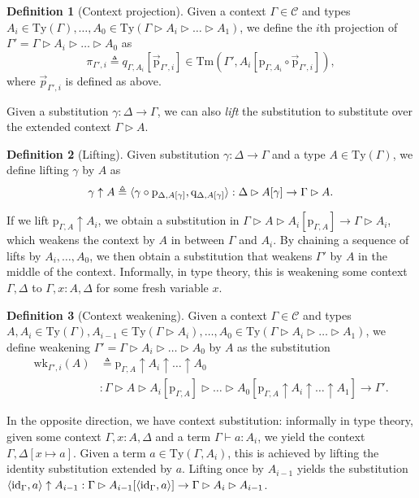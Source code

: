 \documentclass{article}
\renewcommand{\_}{\textrm{\textscale{.5}{\textunderscore}}}
\DeclarePairedDelimiter{\ctxt}{\langle}{\rangle}
\newcommand{\Tm}{\mathrm{Tm}}
\newcommand{\Ty}{\mathrm{Ty}}
\newcommand{\id}{\mathrm{id}}
\newcommand{\p}{\mathrm{p}}
\newcommand{\q}{\mathrm{q}}
\newcommand{\wk}{\mathrm{wk}}
\theoremstyle{definition}
\newtheorem{definition}{Definition}[section]
\theoremstyle{plain}
\begin{document}
\begin{definition}[Context projection]
Given a context $\Gamma \in \mathcal{C}$ and
types $A_i \in \Ty(\Gamma), \dots, A_0 \in \Ty(\Gamma \rhd A_i \rhd \dots \rhd A_1)$,
we define the $i$th projection of $\Gamma' = \Gamma \rhd A_i \rhd \dots \rhd A_0$
as $$\pi_{\Gamma', i} \triangleq q_{\Gamma, A_i}[\vec{\p}_{\Gamma', i}] \in \Tm(\Gamma', A_i[\p_{\Gamma, A_i} \circ \vec{\p}_{\Gamma', i}]),$$
where $\vec{p}_{\Gamma', i}$ is defined as above.
\end{definition}

Given a substitution $\gamma : \Delta \to \Gamma$, we can also \emph{lift} the substitution to substitute over the extended context $\Gamma \rhd A$.

\begin{definition}[Lifting]
Given substitution $\gamma : \Delta \to \Gamma$ and a type $A \in \Ty(\Gamma)$, we define lifting $\gamma$ by $A$ as
$$\gamma \uparrow A \triangleq \ctxt{\gamma \circ \p_{\Delta, A[\gamma]}, \q_{\Delta, A[\gamma]}} : \Delta \rhd A[\gamma] \to \Gamma \rhd A.$$
\end{definition}

If we lift $\p_{\Gamma, A} \uparrow A_i$, we obtain a substitution in $\Gamma \rhd A \rhd A_i[\p_{\Gamma, A}] \to \Gamma \rhd A_i$,
which weakens the context by $A$ in between $\Gamma$ and $A_i$.
By chaining a sequence of lifts by $A_i, \dots, A_0$,
we then obtain a substitution that weakens $\Gamma'$ by $A$ in the middle of the context.
Informally, in type theory, this is weakening some context $\Gamma, \Delta$ to $\Gamma, x:A, \Delta$
for some fresh variable $x$.

\begin{definition}[Context weakening]
Given a context $\Gamma \in \mathcal{C}$ and types $A, A_i \in \Ty(\Gamma), A_{i-1} \in \Ty(\Gamma \rhd A_i), \dots, A_0 \in \Ty(\Gamma \rhd A_i \rhd \dots \rhd A_1)$,
we define weakening $\Gamma' = \Gamma \rhd A_i \rhd \dots \rhd A_0$ by $A$ as the substitution
\begin{align*}
    \wk_{\Gamma', i}(A) &\triangleq \p_{\Gamma, A} \uparrow A_i \uparrow \dots \uparrow A_0 \\
    &: \Gamma \rhd A \rhd A_i[\p_{\Gamma, A}] \rhd \dots \rhd A_0[\p_{\Gamma, A} \uparrow A_i \uparrow \dots \uparrow A_1] \to \Gamma'.
\end{align*}
\end{definition}

In the opposite direction, we have context substitution:
informally in type theory, given some context $\Gamma, x:A, \Delta$ and a term $\Gamma \vdash a : A_i$,
we yield the context $\Gamma, \Delta[x \mapsto a]$.
Given a term $a \in \Ty(\Gamma, A_i)$, this is achieved by lifting the identity substitution extended by $a$.
Lifting once by $A_{i-1}$ yields the substitution
$\ctxt{\id_{\Gamma}, a} \uparrow A_{i-1} : \Gamma \rhd A_{i-1}[\ctxt{\id_{\Gamma}, a}] \to \Gamma \rhd A_i \rhd A_{i-1}$.
\end{document}
